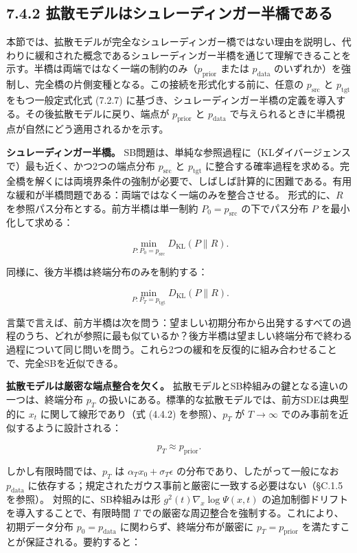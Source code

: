 \subsection*{7.4.2 拡散モデルはシュレーディンガー半橋である}


本節では、拡散モデルが完全なシュレーディンガー橋ではない理由を説明し、代わりに緩和された概念であるシュレーディンガー半橋を通じて理解できることを示す。半橋は両端ではなく一端の制約のみ（$p_{\mathrm{prior}}$ または $p_{\mathrm{data}}$ のいずれか）を強制し、完全橋の片側変種となる。この接続を形式化する前に、任意の $p_{\mathrm{src}}$ と $p_{\mathrm{tgt}}$ をもつ一般定式化式 (7.2.7) に基づき、シュレーディンガー半橋の定義を導入する。その後拡散モデルに戻り、端点が $p_{\mathrm{prior}}$ と $p_{\mathrm{data}}$ で与えられるときに半橋視点が自然にどう適用されるかを示す。

\textbf{シュレーディンガー半橋。} SB問題は、単純な参照過程に（KLダイバージェンスで）最も近く、かつ2つの端点分布 $p_{\mathrm{src}}$ と $p_{\mathrm{tgt}}$ に整合する確率過程を求める。完全橋を解くには両境界条件の強制が必要で、しばしば計算的に困難である。有用な緩和が半橋問題である：両端ではなく一端のみを整合させる。
形式的に、$R$ を参照パス分布とする。前方半橋は単一制約 $P_0=p_{\mathrm{src}}$ の下でパス分布 $P$ を最小化して求める：

\[
\min_{P:P_0=p_{\mathrm{src}}} D_{\mathrm{KL}}(P\|R).
\]


同様に、後方半橋は終端分布のみを制約する：

\[
\min_{P:P_T=p_{\mathrm{tgt}}} D_{\mathrm{KL}}(P\|R).
\]


言葉で言えば、前方半橋は次を問う：望ましい初期分布から出発するすべての過程のうち、どれが参照に最も似ているか？後方半橋は望ましい終端分布で終わる過程について同じ問いを問う。これら2つの緩和を反復的に組み合わせることで、完全SBを近似できる。

\textbf{拡散モデルは厳密な端点整合を欠く。} 拡散モデルとSB枠組みの鍵となる違いの一つは、終端分布 $p_T$ の扱いにある。標準的な拡散モデルでは、前方SDEは典型的に $x_t$ に関して線形であり（式 (4.4.2) を参照）、$p_T$ が $T\to\infty$ でのみ事前を近似するように設計される：

\[
p_T\approx p_{\mathrm{prior}}.
\]


しかし有限時間では、$p_T$ は $\alpha_T x_0+\sigma_T\epsilon$ の分布であり、したがって一般になお $p_{\mathrm{data}}$ に依存する；規定されたガウス事前と厳密に一致する必要はない（§C.1.5を参照）。
対照的に、SB枠組みは形 $g^2(t)\nabla_x\log\Psi(x,t)$ の追加制御ドリフトを導入することで、有限時間 $T$ での厳密な周辺整合を強制する。これにより、初期データ分布 $p_0=p_{\mathrm{data}}$ に関わらず、終端分布が厳密に $p_T=p_{\mathrm{prior}}$ を満たすことが保証される。要約すると：

